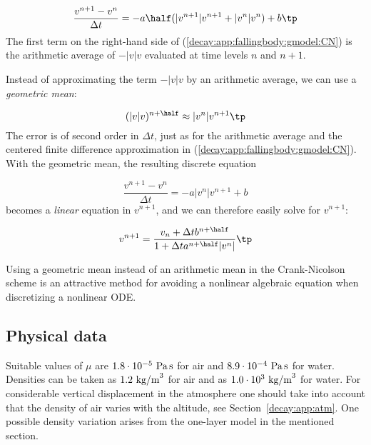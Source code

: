 \documentclass[graybox,sectrefs,envcountresetchap,open=right,final]{svmonodo}
\begin{document}
\begin{equation}
\frac{v^{n+1}-v^n}{\Delta t}
= -a\half(|v^{n+1}|v^{n+1} + |v^n|v^n) + b
\label{decay:app:fallingbody:gmodel:CN}
\tp
\end{equation}
The first term on the right-hand side of (\ref{decay:app:fallingbody:gmodel:CN})
is the arithmetic average of $-|v|v$ evaluated at time levels $n$ and $n+1$.

Instead of approximating the term $-|v|v$ by an arithmetic
average, we can use a \emph{geometric mean}:


\begin{equation}
(|v|v)^{n+\half} \approx |v^n|v^{n+1}
\tp
\end{equation}
The error is of second order in $\Delta t$, just as for the arithmetic
average and the centered finite difference approximation in
(\ref{decay:app:fallingbody:gmodel:CN}). With the geometric mean,
the resulting discrete equation

\[
\frac{v^{n+1}-v^n}{\Delta t} = - a|v^{n}|v^{n+1} + b
\]
becomes a \emph{linear} equation in $v^{n+1}$, and we can
therefore easily solve for $v^{n+1}$:

\begin{equation}
v^{n+1} = \frac{v_n + \Delta t b^{n+\half}}{1 + \Delta t a^{n+\half}|v^{n}|}\tp
\label{decay:app:fallingbody:gmodel:q:CN}
\end{equation}

Using a geometric mean instead of an arithmetic mean in the Crank-Nicolson
scheme is an attractive method for avoiding a nonlinear algebraic
equation when discretizing a nonlinear ODE.


\subsection{Physical data}

Suitable values of $\mu$ are $1.8\cdot 10^{-5}\hbox{ Pa}\, \hbox{s}$ for air
and $8.9\cdot 10^{-4}\hbox{ Pa}\, \hbox{s}$ for water.
Densities can be taken as $1.2\hbox{ kg/m}^3$ for air and as
$1.0\cdot 10^3\hbox{ kg/m}^3$ for water. For considerable vertical
displacement in the atmosphere one should take into account that
the density of air varies with the altitude, see Section~\ref{decay:app:atm}.
One possible density variation arises from the one-layer model
in the mentioned section.
\end{document}
